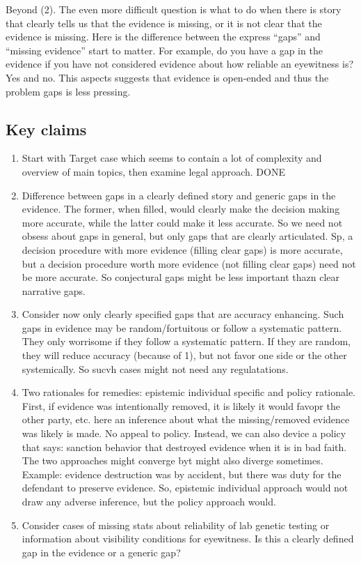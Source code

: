 \documentclass[
  10pt,
  dvipsnames,enabledeprecatedfontcommands]{scrartcl}
\begin{document}
Beyond (2). The even more difficult question is what to do when there is
story that clearly tells us that the evidence is missing, or it is not
clear that the evidence is missing. Here is the difference between the
express ``gaps'' and ``missing evidence'' start to matter. For example,
do you have a gap in the evidence if you have not considered evidence
about how reliable an eyewitness is? Yes and no. This aspects suggests
that evidence is open-ended and thus the problem gaps is less pressing.

\hypertarget{key-claims}{%
\subsection{Key claims}\label{key-claims}}

\begin{enumerate}
\def\labelenumi{(\arabic{enumi})}
\setcounter{enumi}{-1}
\item
  Start with Target case which seems to contain a lot of complexity and
  overview of main topics, then examine legal approach. DONE
\item
  Difference between gaps in a clearly defined story and generic gaps in
  the evidence. The former, when filled, would clearly make the decision
  making more accurate, while the latter could make it less accurate. So
  we need not obsess about gaps in general, but only gaps that are
  clearly articulated. Sp, a decision procedure with more evidence
  (filling clear gaps) is more accurate, but a decision procedure worth
  more evidence (not filling clear gaps) need not be more accurate. So
  conjectural gaps might be less important thazn clear narrative gaps.
\item
  Consider now only clearly specified gaps that are accuracy enhancing.
  Such gaps in evidence may be random/fortuitous or follow a systematic
  pattern. They only worrisome if they follow a systematic pattern. If
  they are random, they will reduce accuracy (because of 1), but not
  favor one side or the other systemically. So sucvh cases might not
  need any regulatations.
\item
  Two rationales for remedies: epistemic individual specific and policy
  rationale. First, if evidence was intentionally removed, it is likely
  it would favopr the other party, etc. here an inference about what the
  missing/removed evidence was likely is made. No appeal to policy.
  Instead, we can also device a policy that says: sanction behavior that
  destroyed evidence when it is in bad faith. The two approaches might
  converge byt might also diverge sometimes. Example: evidence
  destruction was by accident, but there was duty for the defendant to
  preserve evidence. So, epistemic individual approach would not draw
  any adverse inference, but the policy approach would.
\item
  Consider cases of missing stats about reliability of lab genetic
  testing or information about visibility conditions for eyewitness. Is
  this a clearly defined gap in the evidence or a generic gap?
\end{enumerate}
\end{document}
